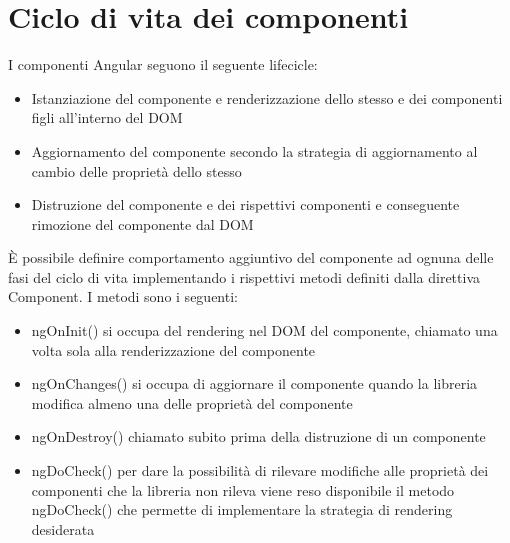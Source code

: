 \section{Ciclo di vita dei componenti}
I componenti Angular seguono il seguente lifecicle:

\begin{itemize}
    \item Istanziazione del componente e renderizzazione dello stesso e dei componenti figli all'interno del DOM
    \item Aggiornamento del componente secondo la strategia di aggiornamento al cambio delle proprietà dello stesso
    \item Distruzione del componente e dei rispettivi componenti e conseguente rimozione del componente dal DOM
\end{itemize}

È possibile definire comportamento aggiuntivo del componente ad ognuna delle fasi del ciclo di vita implementando i rispettivi metodi definiti dalla direttiva Component.
I metodi sono i seguenti:

\begin{itemize}
    \item ngOnInit() si occupa del rendering nel DOM del componente, chiamato una volta sola alla renderizzazione  del componente
    \item ngOnChanges() si occupa di aggiornare il componente quando la libreria modifica almeno una delle proprietà del componente
    \item ngOnDestroy() chiamato subito prima della distruzione di un componente
    \item ngDoCheck() per dare la possibilità di rilevare modifiche alle proprietà dei componenti che la libreria non rileva viene reso disponibile il metodo ngDoCheck() che permette di implementare la strategia di rendering desiderata 
\end{itemize}

